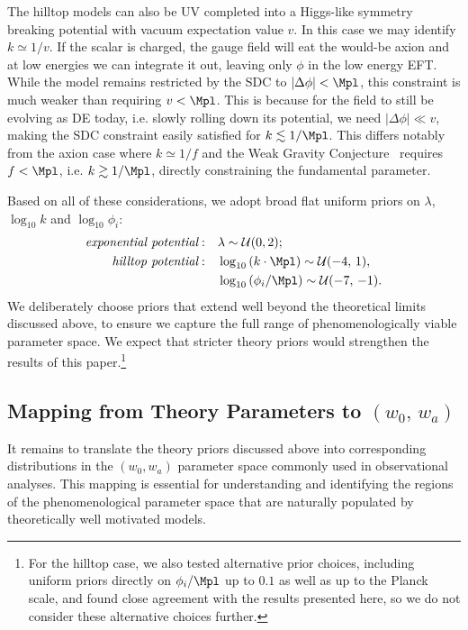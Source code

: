 The hilltop models can also be UV completed into a Higgs-like symmetry breaking potential with vacuum expectation value $v$. In this case we may identify $k\simeq 1/v$.  If the scalar is charged, the gauge field will eat the would-be axion and at low energies we can integrate it out, leaving only $\phi$ in the low energy EFT. While the model remains restricted by the SDC to $|\Delta \phi| < \Mpl$, this constraint is much weaker than requiring $v< \Mpl$. This is because for the field to still be evolving as DE today, i.e. slowly rolling down its potential,  we need $|\Delta \phi|\ll v$, making the SDC constraint easily satisfied for $k\lesssim 1/\Mpl$. This differs notably from the axion case where $k\simeq 1/f$ and the Weak Gravity Conjecture~\cite{Arkani-Hamed:2006emk, Harlow:2022ich} requires $f < \Mpl$, i.e. $k\gtrsim 1/\Mpl$, directly constraining the fundamental parameter.

Based on all of these considerations, we adopt broad flat uniform priors on $\lambda$, $\log_{10} k$ and $\log_{10}\phi_i$:
\begin{align}
    {\text{\it exponential potential}}:\quad &\lambda\sim\mathcal{U}(0,2); \label{eq:ch11-Prior_exp}\\
    {\text{\it hilltop potential}}: \quad &\log_{10}\left(k\cdot {\Mpl}\right)\sim \mathcal{U}(-4,\,1),\nonumber \\
    &\log_{10}\left(\phi_i/\Mpl\right)\sim \mathcal{U}(-7,\,-1). \label{eq:ch11-Prior_hilltop}
\end{align}
We deliberately choose priors that extend well beyond the theoretical limits discussed above, to ensure
we capture the full range of phenomenologically viable parameter space. We expect that stricter theory priors would strengthen the results of this paper.\footnote{For the hilltop case, we also tested alternative prior choices, including uniform priors directly on $\phi_i/\Mpl$ up to $0.1$ as well as up to the Planck scale, and found close agreement with the results presented here, so we do not consider these alternative choices further.}

\subsection{Mapping from Theory Parameters to $(w_0,\,w_a)$}
\label{subsec:ch11-mapping}

\noindent
It remains to translate the theory priors discussed above into corresponding distributions in the $(w_0,w_a)$ parameter space commonly used in observational analyses. This mapping is essential for understanding and identifying the
regions of the phenomenological parameter space that are naturally populated by theoretically well motivated models.

